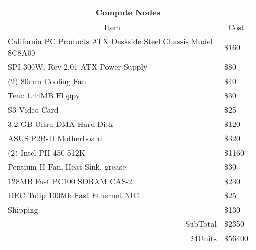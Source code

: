 





\newpage




\begin{tabular}
[c]{|c|c|}\hline\hline
\multicolumn{2}{|c|}{Compute Nodes}\\\hline\hline
Item & Cost\\\cline{1-1}%
\multicolumn{1}{|l|}{California PC Products ATX Deskside Steel Chassis Model
8C8A00} & \multicolumn{1}{|l|}{\$160}\\\cline{1-1}%
\multicolumn{1}{|l|}{SPI 300W, Rev 2.01 ATX Power Supply} &
\multicolumn{1}{|l|}{\$80}\\\cline{1-1}%
\multicolumn{1}{|l|}{(2) 80mm Cooling Fan} & \multicolumn{1}{|l|}{\$40}%
\\\cline{1-1}%
\multicolumn{1}{|l|}{Teac 1.44MB Floppy} & \multicolumn{1}{|l|}{\$30}%
\\\cline{1-1}%
\multicolumn{1}{|l|}{S3 Video Card} & \multicolumn{1}{|l|}{\$25}\\\cline{1-1}%
\multicolumn{1}{|l|}{3.2 GB Ultra DMA Hard Disk} & \multicolumn{1}{|l|}{\$120}%
\\\cline{1-1}%
\multicolumn{1}{|l|}{ASUS P2B-D Motherboard} & \multicolumn{1}{|l|}{\$320}%
\\\cline{1-1}%
\multicolumn{1}{|l|}{(2) Intel PII-450 512K} & \multicolumn{1}{|l|}{\$1160}%
\\\cline{1-1}%
\multicolumn{1}{|l|}{Pentium II Fan, Heat Sink, grease} &
\multicolumn{1}{|l|}{\$30}\\\hline
\multicolumn{1}{|l|}{128MB Fast PC100 SDRAM CAS-2} &
\multicolumn{1}{|l|}{\$230}\\\hline
\multicolumn{1}{|l|}{DEC Tulip 100Mb Fast Ethernet NIC} &
\multicolumn{1}{|l|}{\$25}\\\hline
\multicolumn{1}{|l|}{Shipping} & \multicolumn{1}{|l|}{\$130}\\\hline
\multicolumn{1}{|r|}{SubTotal} & \multicolumn{1}{|l|}{\$2350}\\\hline
\multicolumn{1}{|r|}{24Units} & \multicolumn{1}{|l|}{\$56400}\\\hline
\end{tabular}
\newline 


